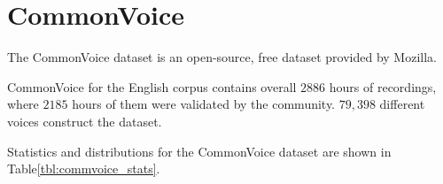 
\section{CommonVoice}
The CommonVoice dataset is an open-source, 
free dataset provided by Mozilla.

CommonVoice for the English corpus
contains overall \(2886\) hours of recordings, where
\(2185\) hours of them were validated by the community.
\(79,398\) different voices construct the dataset.
\bigskip

Statistics and distributions for the CommonVoice dataset 
are shown in Table\;\ref{tbl:commvoice_stats}.

